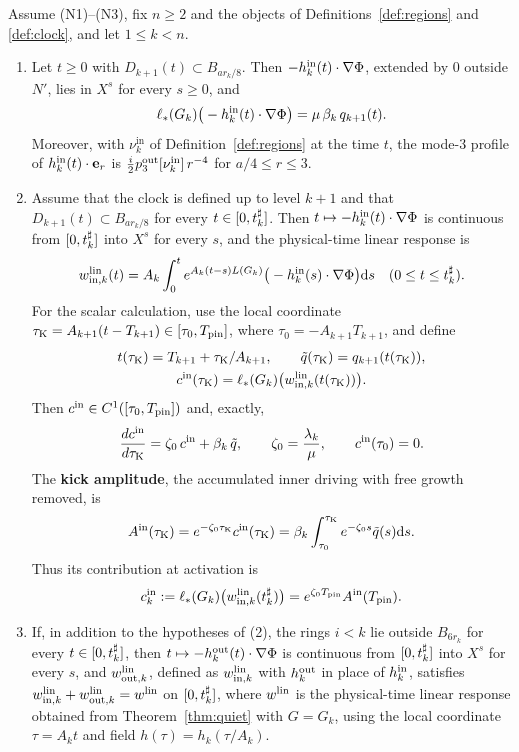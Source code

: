 \begin{lemma}
\label{lem:coupling}
Assume \textup{(N1)}--\textup{(N3)}, fix $n\ge2$ and the objects of
Definitions~\ref{def:regions} and \ref{def:clock}, and let $1\le k<n$.
\begin{enumerate}[label=\textup{(\arabic*)}]
\item Let $t\ge0$ with $D_{k+1}(t)\subset B_{ar_k/8}$. Then
  $-h^{\mathrm{in}}_k(t)\cdot\nabla\Phi$, extended by $0$ outside $N'$, lies in $X^s$
  for every $s\ge0$, and
  \[
  \ell_*(G_k)\big(-h^{\mathrm{in}}_k(t)\cdot\nabla\Phi\big)=\mu\,\beta_k\,q_{k+1}(t).
  \]
  Moreover, with $\nu^{\mathrm{in}}_k$ of Definition~\ref{def:regions} at the
  time $t$, the mode-$3$ profile of $h^{\mathrm{in}}_k(t)\cdot\textbf{e}_r$ is
  $\frac i2p^{\mathrm{out}}_3[\nu^{\mathrm{in}}_k]\,r^{-4}$ for $a/4\le r\le3$.
\item Assume that the clock is defined up to level $k+1$ and that
  $D_{k+1}(t)\subset B_{ar_k/8}$ for every $t\in[0,t^\sharp_k]$. Then
  $t\mapsto-h^{\mathrm{in}}_k(t)\cdot\nabla\Phi$ is continuous from $[0,t^\sharp_k]$ into
  $X^s$ for every $s$, and the physical-time linear response is
  \[
  w^{\mathrm{lin}}_{\mathrm{in},k}(t)=A_k\int_0^t e^{A_k(t-s)L(G_k)}\big(-h^{\mathrm{in}}_k(s)\cdot\nabla\Phi\big)\dd s
  \quad(0\le t\le t^\sharp_k).
  \]
  For the scalar calculation, use the local coordinate
  $\tau_{\mathrm{K}}=A_{k+1}(t-T_{k+1})\in[\tau_0,T_{\mathrm{pin}}]$, where
  $\tau_0=-A_{k+1}T_{k+1}$, and define
  \[
  \begin{gathered}
  t(\tau_{\mathrm{K}})=T_{k+1}+\tau_{\mathrm{K}}/A_{k+1},\qquad
  \tilde q(\tau_{\mathrm{K}})=q_{k+1}(t(\tau_{\mathrm{K}})),\\
  c^{\mathrm{in}}(\tau_{\mathrm{K}})=\ell_*(G_k)\big(w^{\mathrm{lin}}_{\mathrm{in},k}(t(\tau_{\mathrm{K}}))\big).
  \end{gathered}
  \]
  Then
  $c^{\mathrm{in}}\in C^1([\tau_0,T_{\mathrm{pin}}])$ and, exactly,
  \begin{equation}
  \label{eq:kick}
  \frac{dc^{\mathrm{in}}}{d\tau_{\mathrm{K}}}=\zeta_0\,c^{\mathrm{in}}+\beta_k\,\tilde q,\qquad \zeta_0=\frac{\lambda_k}{\mu},\qquad
  c^{\mathrm{in}}(\tau_0)=0 .
  \end{equation}
  The \textbf{kick amplitude}, the accumulated inner driving with free growth
  removed, is
  \begin{equation}
  \label{eq:kick-amplitude}
  A^{\mathrm{in}}(\tau_{\mathrm{K}})=e^{-\zeta_0\tau_{\mathrm{K}}}c^{\mathrm{in}}(\tau_{\mathrm{K}})
  =\beta_k\int_{\tau_0}^{\tau_{\mathrm{K}}}e^{-\zeta_0s}\tilde q(s)\dd s.
  \end{equation}
  Thus its contribution at activation is
  \begin{equation}
  \label{eq:kick-coefficient}
  c^{\mathrm{in}}_k:=\ell_*(G_k)\big(w^{\mathrm{lin}}_{\mathrm{in},k}(t^\sharp_k)\big)=e^{\zeta_0T_{\mathrm{pin}}}A^{\mathrm{in}}(T_{\mathrm{pin}}).
  \end{equation}
\item If, in addition to the hypotheses of \textup{(2)}, the rings $i<k$ lie
  outside $B_{6r_k}$ for every $t\in[0,t^\sharp_k]$, then
  $t\mapsto-h^{\mathrm{out}}_k(t)\cdot\nabla\Phi$ is continuous from $[0,t^\sharp_k]$ into
  $X^s$ for every $s$, and $w^{\mathrm{lin}}_{\mathrm{out},k}$, defined as
  $w^{\mathrm{lin}}_{\mathrm{in},k}$ with $h^{\mathrm{out}}_k$ in place of $h^{\mathrm{in}}_k$, satisfies $w^{\mathrm{lin}}_{\mathrm{in},k}+w^{\mathrm{lin}}_{\mathrm{out},k}=w^{\mathrm{lin}}$ on
  $[0,t^\sharp_k]$, where $w^{\mathrm{lin}}$ is the physical-time linear response obtained
  from Theorem~\ref{thm:quiet} with $G=G_k$, using the local coordinate
  $\tau=A_kt$ and field $h(\tau)=h_k(\tau/A_k)$.
\end{enumerate}
\end{lemma}
